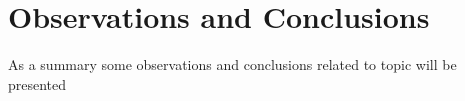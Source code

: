 \section{Observations and Conclusions}
\label{ObservationsConclusions}

As a summary some observations and conclusions related to topic will be presented